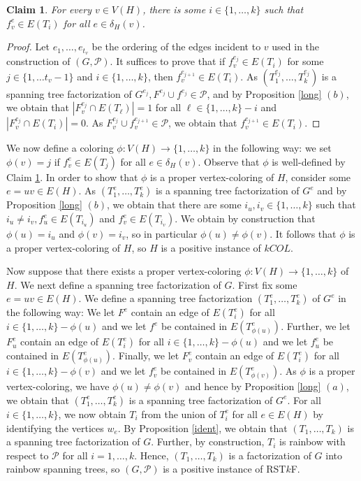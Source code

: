 \documentclass{article}
\newtheorem{Claim}[Statement]{Claim}
\begin{document}
\begin{Claim}\label{ds}
For every $v \in V(H)$, there is some $i \in \{1,\ldots,k\}$ such that $f^{e}_v \in E(T_i)$ for all $e \in\delta_H(v)$.
\end{Claim}
\begin{proof}
Let $e_1,\ldots,e_{t_v}$ be the ordering of the edges incident to $v$ used in the construction of $(G,\mathcal{P})$. It suffices to prove that if $f^{e_j}_v\in E(T_i)$ for some $j \in \{1,\ldots t_v-1\}$ and $i \in \{1,\ldots,k\}$, then $f^{e_{j+1}}_v\in E(T_i)$. As $(T_1^{e_j},\ldots,T_k^{e_j})$ is a spanning tree factorization of $G^{e_j}, F^{e_j}\cup f^{e_j} \in \mathcal{P}$, and by Proposition \ref{long} $(b)$, we obtain that $|F^{e_j}_v \cap E(T_{\ell})|=1$ for all $\ell \in \{1,\ldots,k\}-i$ and $|F^{e_j}_v \cap E(T_i)|=0$. As $F^{e_j}_v\cup f^{e_{j+1}}_v \in \mathcal{P}$, we obtain that $f^{e_{j+1}}_v\in E(T_i)$.
\end{proof}

We now define a coloring $\phi:V(H) \rightarrow \{1,\ldots,k\}$ in the following way: we set $\phi(v)=j$ if $f^{e}_v\in E(T_j)$ for all $e \in \delta_H(v)$. Observe that $\phi$ is well-defined by Claim \ref{ds}. In order to show that $\phi$ is a proper vertex-coloring of $H$, consider some $e=uv \in E(H)$. As $(T_1^{e},\ldots,T_k^{e})$ is a spanning tree factorization of $G^{e}$ and by Proposition \ref{long} $(b)$, we obtain that there are some $i_u,i_v \in \{1,\ldots,k\}$ such that $i_u \neq i_v, f^{e}_u \in E(T_{i_u})$ and $f^{e}_v \in E(T_{i_v})$. We obtain by construction that $\phi(u)=i_u$ and  $\phi(v)=i_v$, so in particular $\phi(u)\neq \phi(v)$. It follows that $\phi$ is a proper vertex-coloring of $H$, so $H$ is a positive instance of $kCOL$.

Now suppose that there exists a proper vertex-coloring $\phi:V(H) \rightarrow \{1,\ldots,k\}$ of $H$.  We next define a spanning tree factorization of $G$. First fix some $e=uv \in E(H)$. We define a spanning tree factorization $(T^{e}_1,\ldots,T^{e}_k)$ of $G^{e}$ in the following way: We let $F^{e}$ contain an edge of $E(T^{e}_i)$ for all $i \in \{1,\ldots,k\}-\phi(u)$ and we let $f^{e}$ be contained in $E(T^{e}_{\phi(u)})$. Further, we let $F^{e}_u$ contain an edge of $E(T^{e}_i)$ for all $i \in \{1,\ldots,k\}-\phi(u)$ and we let $f^{e}_u$ be contained in $E(T^{e}_{\phi(u)})$. Finally, we let $F^{e}_v$ contain an edge of $E(T^{e}_i)$ for all $i \in \{1,\ldots,k\}-\phi(v)$ and we let $f^{e}_v$ be contained in $E(T^{e}_{\phi(v)})$. As $\phi$ is a proper vertex-coloring, we have $\phi(u)\neq \phi(v)$ and hence by  Proposition \ref{long} $(a)$, we obtain that $(T^{e}_1,\ldots,T^{e}_k)$ is a spanning tree factorization of $G^{e}$. For all $i \in \{1,\ldots,k\}$, we now obtain $T_i$ from the union of $T^{e}_i$ for all $e \in E(H)$ by identifying the vertices $w_e$. By Proposition \ref{ident}, we obtain that $(T_1,\ldots,T_k)$ is a spanning tree factorization of $G$. Further, by construction, $T_i$ is rainbow with respect to $\mathcal{P}$ for all $i=1,\ldots,k$. Hence, $(T_1,\ldots,T_k)$ is a factorization of $G$ into rainbow spanning trees, so $(G,\mathcal{P})$ is a positive instance of RST$k$F.
\end{document}
